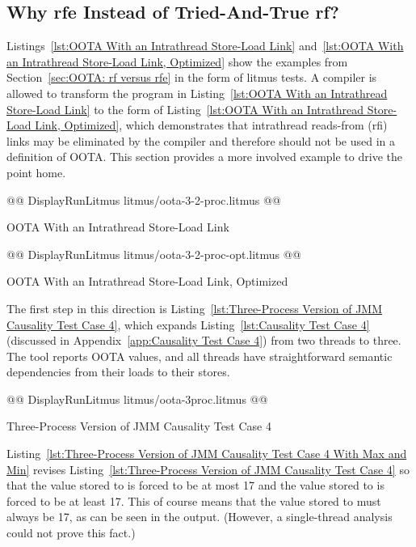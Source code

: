 \documentclass[10]{article}
\begin{document}
\subsection{Why rfe Instead of Tried-And-True rf?}
\label{app:Why rfe Instead of Tried-And-True rf?}

Listings~\ref{lst:OOTA With an Intrathread Store-Load Link}
and~\ref{lst:OOTA With an Intrathread Store-Load Link, Optimized}
show the examples from
Section~\ref{sec:OOTA: rf versus rfe}
in the form of litmus tests.
A compiler is allowed to transform the program in
Listing~\ref{lst:OOTA With an Intrathread Store-Load Link}
to the form of
Listing~\ref{lst:OOTA With an Intrathread Store-Load Link, Optimized},
which demonstrates that intrathread reads-from (rfi) links may be
eliminated by the compiler and therefore should not be used in a
definition of OOTA.
This section provides a more involved example to drive the point home.

\begin{listing}[tbp]
@@ DisplayRunLitmus litmus/oota-3-2-proc.litmus @@
\caption{OOTA With an Intrathread Store-Load Link}
\label{lst:OOTA With an Intrathread Store-Load Link}
\end{listing}

\begin{listing}[tbp]
@@ DisplayRunLitmus litmus/oota-3-2-proc-opt.litmus @@
\caption{OOTA With an Intrathread Store-Load Link, Optimized}
\label{lst:OOTA With an Intrathread Store-Load Link, Optimized}
\end{listing}

The first step in this direction is
Listing~\ref{lst:Three-Process Version of JMM Causality Test Case 4},
which expands
Listing~\ref{lst:Causality Test Case 4}
(discussed in
Appendix~\ref{app:Causality Test Case 4})
from two threads to three.
The  tool reports OOTA values, and
all threads have straightforward semantic dependencies from their
loads to their stores.

\begin{listing}[tbp]
@@ DisplayRunLitmus litmus/oota-3proc.litmus @@
\caption{Three-Process Version of JMM Causality Test Case 4}
\label{lst:Three-Process Version of JMM Causality Test Case 4}
\end{listing}

Listing~\ref{lst:Three-Process Version of JMM Causality Test Case 4 With Max and Min}
revises Listing~\ref{lst:Three-Process Version of JMM Causality Test Case 4}
so that the value stored to  is forced to be at most 17
and the value stored to  is forced to be at least 17.
This of course means that the value stored to  must always be
17, as can be seen in the  output.
(However, a single-thread analysis could not prove this fact.)
\end{document}
